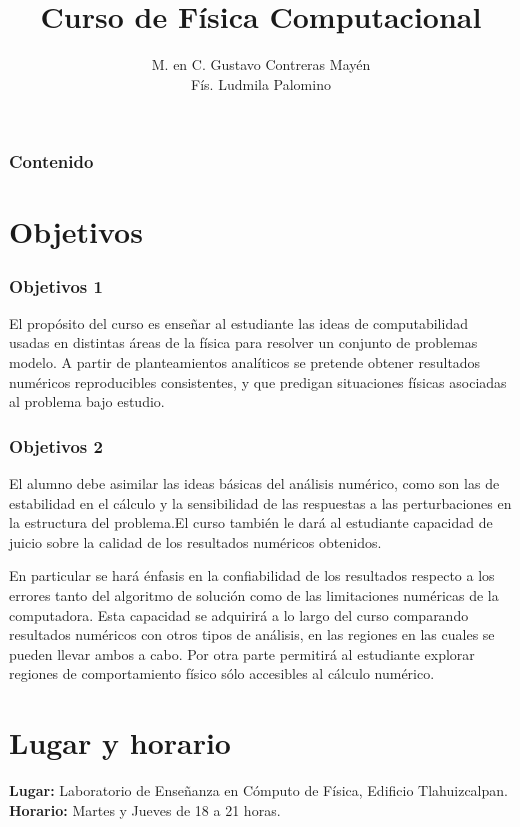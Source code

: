 \documentclass[12pt]{beamer}
\title{Curso de Física Computacional}
\author[]{M. en C. Gustavo Contreras Mayén \\ Fís. Ludmila Palomino}
\date{ }
\begin{document}
\maketitle
\fontsize{14}{14}\selectfont
{}
\begin{frame}
\frametitle{Contenido}
\tableofcontents[pausesections]
\end{frame}
\section{Objetivos}
\begin{frame}
\frametitle{Objetivos 1}
El propósito del curso es enseñar al estudiante las ideas de computabilidad usadas en distintas áreas de la  física para resolver un conjunto de problemas modelo. A partir de planteamientos analíticos se pretende obtener resultados numéricos reproducibles consistentes, y que predigan situaciones físicas asociadas al problema bajo estudio.
\end{frame}
\begin{frame}
\frametitle{Objetivos 2}
El alumno debe asimilar las ideas básicas del análisis numérico, como son las de estabilidad en el cálculo y la sensibilidad de las respuestas a las perturbaciones en la estructura del problema.El curso también le dará al estudiante capacidad de juicio sobre la calidad de los resultados numéricos obtenidos.
\end{frame}
\begin{frame}
En particular se hará énfasis en la confiabilidad de los resultados respecto a los errores tanto del algoritmo de solución como de las limitaciones numéricas de la computadora. Esta capacidad se adquirirá a lo largo del curso comparando resultados numéricos con otros tipos de análisis, en las regiones en las cuales se pueden llevar ambos a cabo. Por otra parte permitirá al estudiante explorar regiones de comportamiento físico sólo accesibles al cálculo numérico.
\end{frame}
\section{Lugar y horario}
\begin{frame} 
\textbf{Lugar: }Laboratorio de Enseñanza en Cómputo de Física, Edificio Tlahuizcalpan.
\\
\bigskip
\textbf{Horario: } Martes y Jueves de 18 a 21 horas.
\end{frame}
\end{document}
